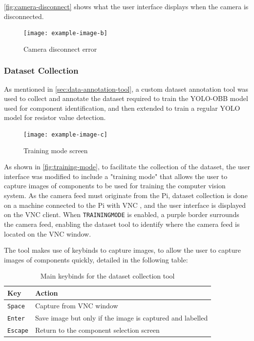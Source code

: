 \autoref{fig:camera-disconnect} shows what the user interface displays when the camera is disconnected.

\begin{figure}[H]
    \hfill
    \begin{minipage}[t]{\textwidth}
      \centering
      \texttt{[image: example-image-b]}
      \caption{Camera disconnect error}
      \label{fig:camera-disconnect}
    \end{minipage}
\end{figure}

\subsubsection{Dataset Collection}
\label{sec:dataset-collection}
As mentioned in \autoref{sec:data-annotation-tool}, a custom dataset annotation tool was used to collect and annotate the dataset required to train the YOLO-OBB model used for component identification, and then extended to train a regular YOLO model for resistor value detection.

\begin{figure}[H]
    \hfill
    \begin{minipage}[t]{\textwidth}
      \centering
      \texttt{[image: example-image-c]}
      \caption{Training mode screen}
      \label{fig:training-mode}
    \end{minipage}
\end{figure}

As shown in \autoref{fig:training-mode}, to facilitate the collection of the dataset, the user interface was modified to include a "training mode" that allows the user to capture images of components to be used for training the computer vision system. As the camera feed must originate from the Pi, dataset collection is done on a machine connected to the Pi with VNC \cite{realvnc}, and the user interface is displayed on the VNC client. When \texttt{TRAININGMODE} is enabled, a purple border surrounds the camera feed, enabling the dataset tool to identify where the camera feed is located on the VNC window.

The tool makes use of keybinds to capture images, to allow the user to capture images of components quickly, detailed in the following table:

\begin{table}[H]
    \centering
    \begin{tabularx}{0.8\textwidth}{|p{2cm}|X|}
        \hline
        \textbf{Key} & \textbf{Action} \\
        \hline
        \texttt{Space} & Capture from VNC window \\
        \hline
        \texttt{Enter} & Save image but only if the image is captured and labelled \\
        \hline
        \texttt{Escape} & Return to the component selection screen \\
        \hline
    \end{tabularx}
    \caption{Main keybinds for the dataset collection tool}
    \label{tab:keybinds}
\end{table}




